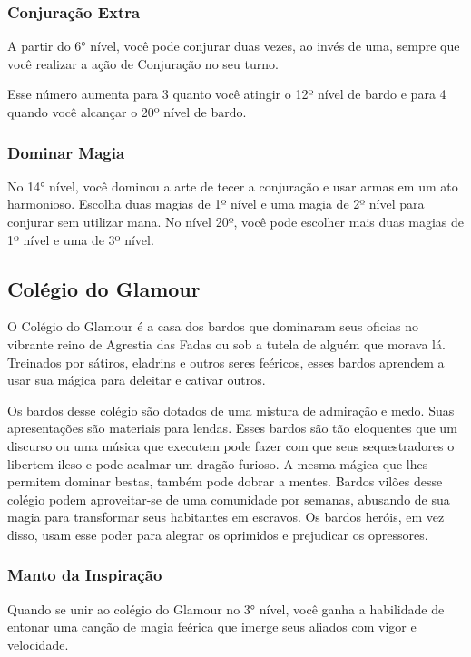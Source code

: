\begin{multicols}{2}
\subsubsection{Conjuração Extra}%

A partir do 6° nível, você pode conjurar duas vezes, ao invés de uma, sempre que
você realizar a ação de Conjuração no seu turno.

Esse número aumenta para 3 quanto você atingir o 12º nível de bardo e para 4
quando você alcançar o 20º nível de bardo.

\subsubsection{Dominar Magia}%

No 14° nível, você dominou a arte de tecer a conjuração e usar armas em um ato
harmonioso. Escolha duas magias de 1º nível e uma magia de 2º nível para
conjurar sem utilizar mana. No nível 20º, você pode escolher mais duas magias de
1º nível e uma de 3º nível.

\subsection*{Colégio do Glamour}%

O Colégio do Glamour é a casa dos bardos que dominaram seus oficias no vibrante
reino de Agrestia das Fadas ou sob a tutela de alguém que morava lá.  Treinados
por sátiros, eladrins e outros seres feéricos, esses bardos aprendem a usar sua
mágica para deleitar e cativar outros.

Os bardos desse colégio são dotados de uma mistura de admiração e medo. Suas
apresentações são materiais para lendas. Esses bardos são tão eloquentes que um
discurso ou uma música que executem pode fazer com que seus sequestradores o
libertem ileso e pode acalmar um dragão furioso. A mesma mágica que lhes
permitem dominar bestas, também pode dobrar a mentes. Bardos vilões desse
colégio podem aproveitar-se de uma comunidade por semanas, abusando de sua
magia para transformar seus habitantes em escravos. Os bardos heróis, em vez
disso, usam esse poder para alegrar os oprimidos e prejudicar os opressores.

\subsubsection{Manto da Inspiração}%

Quando se unir ao colégio do Glamour no 3° nível, você ganha a habilidade de
entonar uma canção de magia feérica que imerge seus aliados com vigor e
velocidade.


\end{multicols}
